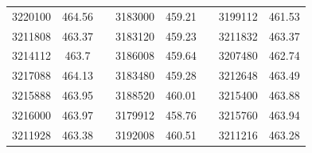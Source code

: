\documentclass[12pt]{mwart}
\begin{document}
\begin{table}[H]
\begin{tabular}{cclcclcc}
		3220100                                                  & 464.56                                                        &  & 3183000                                                  & 459.21                                                        &  & 3199112                                                  & 461.53                                                        \\
		3211808                                                  & 463.37                                                        &  & 3183120                                                  & 459.23                                                        &  & 3211832                                                  & 463.37                                                        \\
		3214112                                                  & 463.7                                                         &  & 3186008                                                  & 459.64                                                        &  & 3207480                                                  & 462.74                                                        \\
		3217088                                                  & 464.13                                                        &  & 3183480                                                  & 459.28                                                        &  & 3212648                                                  & 463.49                                                        \\
		3215888                                                  & 463.95                                                        &  & 3188520                                                  & 460.01                                                        &  & 3215400                                                  & 463.88                                                        \\
		3216000                                                  & 463.97                                                        &  & 3179912                                                  & 458.76                                                        &  & 3215760                                                  & 463.94                                                        \\
		3211928                                                  & 463.38                                                        &  & 3192008                                                  & 460.51                                                        &  & 3211216                                                  & 463.28                                                        \\

\end{tabular}
\end{table}
\end{document}
